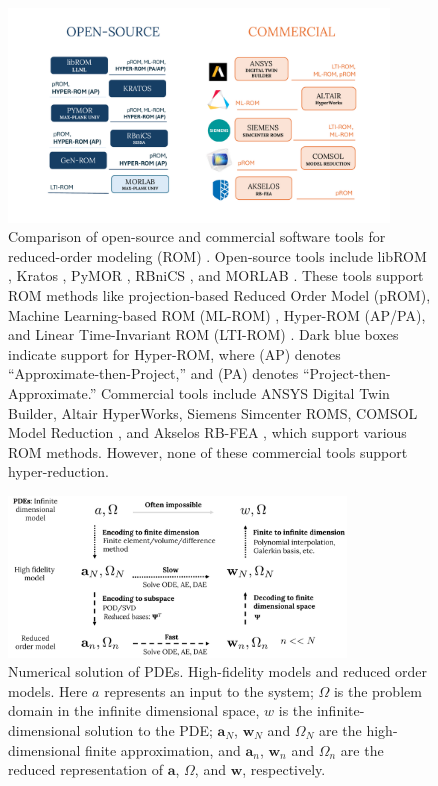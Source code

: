 \documentclass[11pt]{article}
\renewcommand{\vec}[1]{\mathbf{#1}}
\begin{document}
\begin{figure}[t]
    \centering
    \includegraphics[width=0.9\textwidth]{software_survey5.pdf}
    \caption{Comparison of open-source and commercial software tools for reduced-order modeling (ROM) \protect\footnotemark. Open-source tools include libROM \cite{Choi2019libROM}, Kratos \cite{vicente_mataix_ferrandiz_2022_6395887}, PyMOR \cite{milk2016pymor}, RBniCS \cite{RozzaBallarinScandurraPichi2024}, and MORLAB \cite{BenW21c}. These tools support ROM methods like projection-based Reduced Order Model (pROM), Machine Learning-based ROM (ML-ROM) \cite{Drakoulas_2023,TANNOUS_2024}, Hyper-ROM (AP/PA), and Linear Time-Invariant ROM (LTI-ROM) \cite{Sikander_2017}. Dark blue boxes indicate support for Hyper-ROM, where (AP) denotes ``Approximate-then-Project,'' and (PA) denotes ``Project-then-Approximate.'' Commercial tools include ANSYS Digital Twin Builder, Altair HyperWorks, Siemens Simcenter ROMS, COMSOL Model Reduction \cite{saha2019reduced,deng2021reduced-order,Zhang_2021}, and Akselos RB-FEA \cite{Di_Nicola_2024,Sharma_2018,BRENNER_2023}, which support various ROM methods. However, none of these commercial tools support hyper-reduction.}
    \label{fig:ROM_software}
\end{figure}

\begin{figure}[t]
\centering
\includegraphics[width=0.8\textwidth]{schematic.pdf}
\caption{Numerical solution of PDEs. High-fidelity models and reduced order models. Here $a$ represents an input to the system; $\Omega$ is the problem domain in the infinite dimensional space, $w$ is the infinite-dimensional solution to the PDE; $\vec{a}_N$, $\vec{w}_N$ and $\Omega_N$ are the high-dimensional finite approximation, and $\vec{a}_n$, $\vec{w}_n$ and $\Omega_n$ are the reduced representation of  $\vec{a}$, $\Omega$, and $\vec{w}$, respectively.}
\label{fig:ROM_FOM_schematic}
\end{figure}
\end{document}
